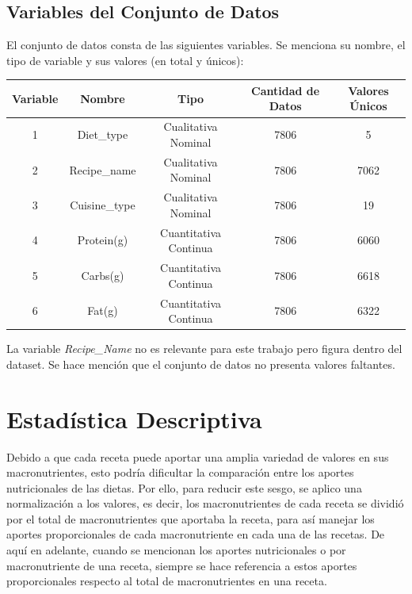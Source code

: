 \documentclass[12pt,a4paper]{article}
\begin{document}
    \subsection{Variables del Conjunto de Datos}
    El conjunto de datos consta de las siguientes variables. Se menciona su 
    nombre, el tipo de variable y sus valores (en total y únicos):
    \begin{center}
        \begin{tabular}{|c|c|c|c|c|}
            \hline
            Variable & Nombre & Tipo & Cantidad de Datos & Valores Únicos\\
            \hline
            1 & Diet\_type & Cualitativa Nominal & 7806 & 5 \\
            2 & Recipe\_name & Cualitativa Nominal & 7806 & 7062\\
            3 & Cuisine\_type & Cualitativa Nominal & 7806 & 19\\
            4 & Protein(g) & Cuantitativa Continua & 7806 & 6060\\
            5 & Carbs(g) & Cuantitativa Continua & 7806 & 6618\\
            6 & Fat(g) & Cuantitativa Continua & 7806 & 6322\\
            \hline
        \end{tabular}
    \end{center}
    La variable \emph{Recipe\_Name} no es relevante para este trabajo pero figura 
    dentro del dataset. Se hace mención que el conjunto de datos no presenta 
    valores faltantes.

\newpage

\section{Estadística Descriptiva}
    Debido a que cada receta puede aportar una amplia variedad de valores 
    en sus macronutrientes, esto podría dificultar la comparación entre 
    los aportes nutricionales de las dietas. Por ello, para reducir este 
    sesgo, se aplico una normalización a los valores, es decir, 
    los macronutrientes de cada receta se dividió por el total de macronutrientes 
    que aportaba la receta, para así manejar los aportes proporcionales de 
    cada macronutriente en cada una de las recetas. De aquí en adelante, cuando 
    se mencionan los aportes nutricionales o por macronutriente de una receta, 
    siempre se hace referencia a estos aportes proporcionales respecto al total de 
    macronutrientes en una receta. 
\end{document}
